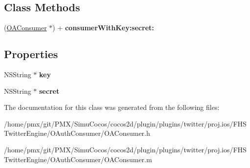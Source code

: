 \subsection*{Class Methods}
\begin{DoxyCompactItemize}
\item 
\mbox{\label{interfaceOAConsumer_a391fb55757323674e4e2b49c9f3b4404}} 
(\hyperlink{interfaceOAConsumer}{O\+A\+Consumer} $\ast$) + {\bfseries consumer\+With\+Key\+:secret\+:}
\end{DoxyCompactItemize}
\subsection*{Properties}
\begin{DoxyCompactItemize}
\item 
\mbox{\label{interfaceOAConsumer_a2768f6eb0cf2d81d022e79f854a921fb}} 
N\+S\+String $\ast$ {\bfseries key}
\item 
\mbox{\label{interfaceOAConsumer_aa1336fcbd4b6212ccd8fa9ee736efafb}} 
N\+S\+String $\ast$ {\bfseries secret}
\end{DoxyCompactItemize}


The documentation for this class was generated from the following files\+:\begin{DoxyCompactItemize}
\item 
/home/pmx/git/\+P\+M\+X/\+Simu\+Cocos/cocos2d/plugin/plugins/twitter/proj.\+ios/\+F\+H\+S\+Twitter\+Engine/\+O\+Auth\+Consumer/O\+A\+Consumer.\+h\item 
/home/pmx/git/\+P\+M\+X/\+Simu\+Cocos/cocos2d/plugin/plugins/twitter/proj.\+ios/\+F\+H\+S\+Twitter\+Engine/\+O\+Auth\+Consumer/O\+A\+Consumer.\+m\end{DoxyCompactItemize}
